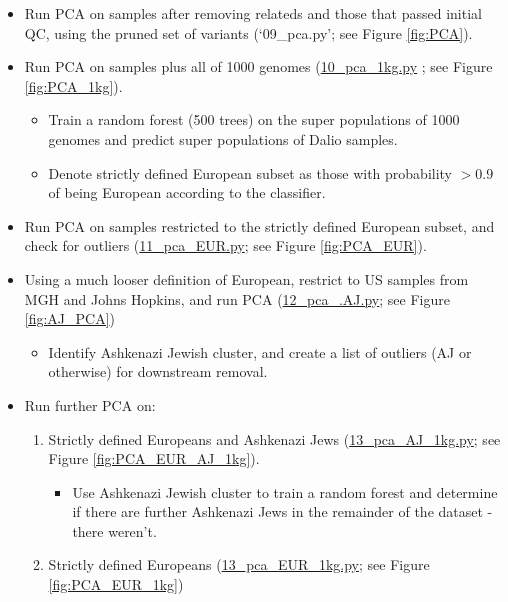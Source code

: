 \documentclass[12pt]{article}
\begin{document}
\begin{itemize}
\begin{itemize}
		\end{itemize}
	\item Run PCA on samples after removing relateds and those that passed initial QC, using the pruned set of variants (`09\_pca.py'; see Figure \ref{fig:PCA}).
	\item Run PCA on samples plus all of 1000 genomes (\href{https://github.com/astheeggeggs/BipEx/blob/master/scripts_Dalio/QC_Dalio/10_pca_1kg.py}{10\_pca\_1kg.py} ; see Figure \ref{fig:PCA_1kg}).
	\begin{itemize}
		\item Train a random forest (500 trees) on the super populations of 1000 genomes and predict super populations of Dalio samples.
		\item Denote strictly defined European subset as those with probability $> 0.9$ of being European according to the classifier. 
	\end{itemize}
	\item Run PCA on samples restricted to the strictly defined European subset, and check for outliers (\href{https://github.com/astheeggeggs/BipEx/blob/master/scripts_Dalio/QC_Dalio/11_pca_EUR.py}{11\_pca\_EUR.py}; see Figure \ref{fig:PCA_EUR}).
	\item Using a much looser definition of European, restrict to US samples from MGH and Johns Hopkins, and run PCA (\href{https://github.com/astheeggeggs/BipEx/blob/master/scripts_Dalio/QC_Dalio/12_pca_.AJ.py}{12\_pca\_.AJ.py}; see Figure \ref{fig:AJ_PCA})
	\begin{itemize}
		\item Identify Ashkenazi Jewish cluster, and create a list of outliers (AJ or otherwise) for downstream removal.
	\end{itemize}
	\item Run further PCA on:
	\begin{enumerate}
		\item Strictly defined Europeans and Ashkenazi Jews (\href{https://github.com/astheeggeggs/BipEx/blob/master/scripts_Dalio/QC_Dalio/13_pca_AJ_1kg.py}{13\_pca\_AJ\_1kg.py}; see Figure \ref{fig:PCA_EUR_AJ_1kg}).
		\begin{itemize}
			\item Use Ashkenazi Jewish cluster to train a random forest and determine if there are further Ashkenazi Jews in the remainder of the dataset - there weren't.
		\end{itemize} 
		\item Strictly defined Europeans (\href{https://github.com/astheeggeggs/BipEx/blob/master/scripts_Dalio/QC_Dalio/13_pca_EUR_1kg.py}{13\_pca\_EUR\_1kg.py}; see Figure \ref{fig:PCA_EUR_1kg})

\end{enumerate}
\end{itemize}
\end{document}

